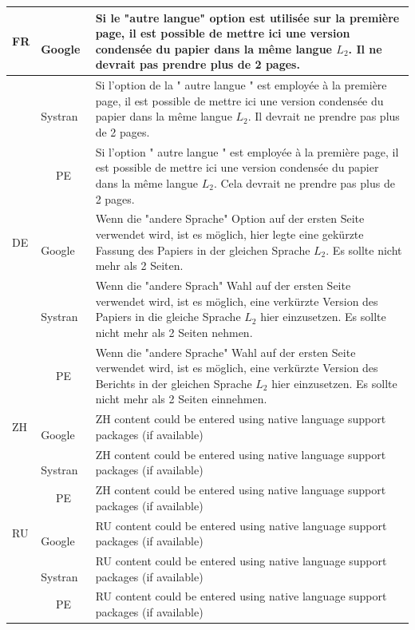 \documentclass[10pt,a5paper,twoside]{article}
\begin{document}
 \begin{longtable}{|l|l|p{10.5cm}|}
 \hline
 FR  &~~ Google  & Si le "autre langue" option est utilis\'ee sur la premi\`ere page, il est possible de mettre ici une version condens\'ee du papier dans la m\^eme langue $L_{2}$. Il ne devrait pas prendre plus de 2 pages.   \\
 \hline
   &~~ Systran  & Si l'option de la " autre langue " est employ\'ee \`a la premi\`ere page, il est possible de mettre ici une version condens\'ee du papier dans la m\^eme langue $L_{2}$. Il devrait ne prendre pas plus de 2 pages.  \\
 \hline
   &~~ PE  & Si l'option " autre langue " est employ\'ee \`a la premi\`ere page, il est possible de mettre ici une version condens\'ee du papier dans la m\^eme langue $L_{2}$. Cela devrait ne prendre pas plus de 2 pages.  \\
 \hline
 DE  &~~ Google  & Wenn die "andere Sprache" Option auf der ersten Seite verwendet wird, ist es m\"oglich, hier legte eine gek\"urzte Fassung des Papiers in der gleichen Sprache $L_{2}$. Es sollte nicht mehr als 2 Seiten.  \\
 \hline
   &~~ Systran  & Wenn die "andere Sprach" Wahl auf der ersten Seite verwendet wird, ist es m\"oglich, eine verk\"urzte Version des Papiers in die gleiche Sprache $L_{2}$ hier einzusetzen. Es sollte nicht mehr als 2 Seiten nehmen.  \\
 \hline
   &~~ PE  & Wenn die "andere Sprache" Wahl auf der ersten Seite verwendet wird, ist es m\"oglich, eine verk\"urzte Version des Berichts in der gleichen Sprache $L_{2}$ hier einzusetzen. Es sollte nicht mehr als 2 Seiten einnehmen.  \\
 \hline
 ZH  &~~ Google  & ZH content could be entered using native language support packages (if available) \\
 \hline
   &~~ Systran  & ZH content could be entered using native language support packages (if available) \\
 \hline
   &~~ PE  & ZH content could be entered using native language support packages (if available) \\
 \hline
 RU  &~~ Google  & RU content could be entered using native language support packages (if available) \\
 \hline
   &~~ Systran  & RU content could be entered using native language support packages (if available) \\
 \hline
   &~~ PE  & RU content could be entered using native language support packages (if available) \\

\end{longtable}
\end{document}
